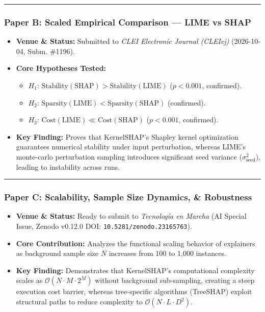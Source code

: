 \documentclass[
]{article}
\providecommand{\tightlist}{%
  \setlength{\itemsep}{0pt}\setlength{\parskip}{0pt}}
\begin{document}
\begin{center}\rule{0.5\linewidth}{0.5pt}\end{center}

\subsubsection{Paper B: Scaled Empirical Comparison --- LIME vs
SHAP}\label{paper-b-scaled-empirical-comparison-lime-vs-shap}

\begin{itemize}
\tightlist
\item
  \textbf{Venue \& Status:} Submitted to \emph{CLEI Electronic Journal
  (CLEIej)} (2026-10-04, Subm. \#1196).
\item
  \textbf{Core Hypotheses Tested:}

  \begin{itemize}
  \tightlist
  \item
    \(H_1\):
    \(\text{Stability}(\text{SHAP}) > \text{Stability}(\text{LIME})\)
    (\(p < 0.001\), confirmed).
  \item
    \(H_2\):
    \(\text{Sparsity}(\text{LIME}) < \text{Sparsity}(\text{SHAP})\)
    (confirmed).
  \item
    \(H_3\): \(\text{Cost}(\text{LIME}) \ll \text{Cost}(\text{SHAP})\)
    (\(p < 0.001\), confirmed).
  \end{itemize}
\item
  \textbf{Key Finding:} Proves that KernelSHAP's Shapley kernel
  optimization guarantees numerical stability under input perturbation,
  whereas LIME's monte-carlo perturbation sampling introduces
  significant seed variance (\(\sigma^2_{\text{seed}}\)), leading to
  instability across runs.
\end{itemize}

\begin{center}\rule{0.5\linewidth}{0.5pt}\end{center}

\subsubsection{Paper C: Scalability, Sample Size Dynamics, \&
Robustness}\label{paper-c-scalability-sample-size-dynamics-robustness}

\begin{itemize}
\tightlist
\item
  \textbf{Venue \& Status:} Ready to submit to \emph{Tecnología en
  Marcha} (AI Special Issue, Zenodo v0.12.0 DOI:
  \texttt{10.5281/zenodo.23165763}).
\item
  \textbf{Core Contribution:} Analyzes the functional scaling behavior
  of explainers as background sample size \(N\) increases from 100 to
  1,000 instances.
\item
  \textbf{Key Finding:} Demonstrates that KernelSHAP's computational
  complexity scales as \(\mathcal{O}(N \cdot M \cdot 2^M)\) without
  background sub-sampling, creating a steep execution cost barrier,
  whereas tree-specific algorithms (TreeSHAP) exploit structural paths
  to reduce complexity to \(\mathcal{O}(N \cdot L \cdot D^2)\).
\end{itemize}
\end{document}
